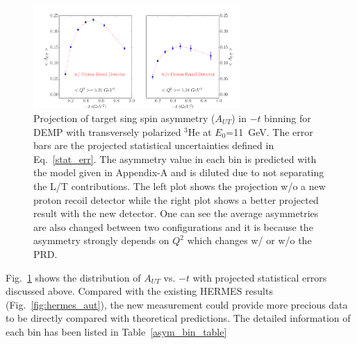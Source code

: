 \begin{figure}[!ht]
 \begin{center}
      \includegraphics[type=pdf,
        ext=.pdf,read=.pdf,width=0.7\textwidth]{./figures/bin_asym_t}
      \caption{\footnotesize{Projection of target sing spin asymmetry
          ($A_{UT}$) in $-t$ binning for DEMP with transversely polarized
          $\mathrm{^{3}He}$ at $E_{0}$=11~GeV. The error bars are the projected
          statistical uncertainties defined in Eq.~\ref{stat_err}. The
          asymmetry value in each bin is predicted with the model given in Appendix-A and is diluted due to not separating the L/T
          contributions. The left plot shows the projection w/o a new proton
          recoil detector while the right plot shows a better projected result
          with the new detector. One can see the average asymmetries are also
          changed between two configurations and it is because the asymmetry
          strongly depends on $Q^{2}$ which changes w/ or w/o the PRD.}}
  \label{asym_t}
  \end{center}
\end{figure}
Fig.~\ref{asym_t} shows the distribution of $A_{UT}$ vs. $-t$ with projected
statistical errors discussed above. Compared with the existing HERMES results
(Fig.~\ref{fig:hermes_aut}), the new measurement could provide more precious
data to be directly compared with theoretical predictions. The detailed information of each bin has been listed in Table~\ref{asym_bin_table}
